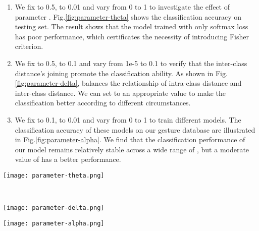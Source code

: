 \documentclass[review]{elsarticle}
\begin{document}
\begin{enumerate}
	\item We fix  to 0.5,  to 0.01 and vary  from 0 to 1 to investigate the effect of parameter . Fig.\;\ref{fig:parameter-theta} shows the classification accuracy on testing set. The result shows that the model trained with only softmax loss has poor performance, which certificates the necessity of introducing Fisher criterion.
	\item We fix  to 0.5,  to 0.1 and vary  from 1e-5 to 0.1 to verify that the inter-class distance’s joining promote the classification ability. As shown in Fig.\;\ref{fig:parameter-delta},   balances the relationship of intra-class distance and inter-class distance. We can set  to an appropriate value to make the classification better according to different circumstances.
	\item We fix  to 0.1,  to 0.01 and vary  from 0 to 1 to train different models. The classification accuracy of these models on our gesture database are illustrated in Fig.\;\ref{fig:parameter-alpha}. We find that the classification performance of our model remains relatively stable across a wide range of , but a moderate value of  has a better performance.
\end{enumerate}

	\begin{figure*}[htp]
	\normalsize
	\begin{minipage}[t]{\linewidth}
		\centering
		\texttt{[image: parameter-theta.png]}
		\caption{Influence of parameter  on recognition accuracy.}
		\label{fig:parameter-theta}
	\end{minipage}
	\hfill \\
	\begin{minipage}[h]{\linewidth}
		\centering
		\texttt{[image: parameter-delta.png]}
		\caption{Influence of parameter  on recognition accuracy.}
		\label{fig:parameter-delta}
	\end{minipage}
	\hfill
\end{figure*}
\begin{figure*}[h]
	\normalsize
	\begin{minipage}[t]{\linewidth}
		\centering
		\texttt{[image: parameter-alpha.png]}
		\caption{Influence of parameter  on recognition accuracy.}
		\label{fig:parameter-alpha}
	\end{minipage}
\end{figure*}
\begin{figure*}[h]
	\normalsize
	\centering
	\\
	\\
	\caption{Feature visualization of 12 classes of MGD database.}
	\label{fig:featurevisualization}
	\vspace*{4pt}
\end{figure*}
\end{document}
